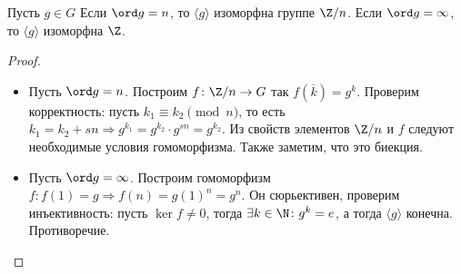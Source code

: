\begin{thm}
    Пусть $ g \in G$ Если $\ord g = n$, то $ \langle g \rangle$ изоморфна группе  $ \Z / n$. Если  $ \ord g = \infty$, то $ \langle g \rangle $ изоморфна $ \Z$.
\end{thm}
\begin{proof}
    $ $
    \begin{itemize}
	\item Пусть $ \ord g =n$. Построим $ f\colon \Z / n \to  G$ так $ f(\overline{k}) = g^{k} $. Проверим корректность: пусть $ k_1 \equiv k_2 \pmod n$, то есть $ k_1 = k_2+sn \Longrightarrow g^{k_1} = g^{k_2} \cdot g^{sn} = g^{k_2}$.  Из свойств элементов   $ \Z / n$ и  $ f$ следуют необходимые условия гомоморфизма. Также заметим, что это биекция.
	\item Пусть $ \ord g = \infty$. Построим гомоморфизм $ f\colon f(1) = g \Longrightarrow f(n) = g(1)^{n} = g^{n}$. Он сюрьективен, проверим инъективность: пусть $ \ker f \ne {0}$, тогда $ \exists k \in \N \colon g^{k} = e $, а тогда $ \langle g \rangle$ конечна. Противоречие. 
    \end{itemize}
\end{proof}
% 

